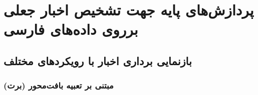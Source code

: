 \chapter{پردازش‌های پایه جهت تشخیص اخبار جعلی برروی داده‌های فارسی}


\section{بازنمایی برداری اخبار با رویکردهای مختلف}

\subsection{مبتنی ‌بر تعبیه بافت‌محور (برت)}